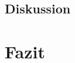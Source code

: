 \documentclass[12pt,a4paper]{article}
\begin{document}
\subsection{Diskussion}






\section{Fazit}
\end{document}

